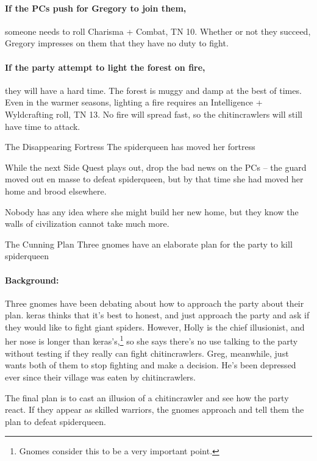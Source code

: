 \begin{multicols}{2}
\paragraph{If the PCs push for Gregory to join them,}
someone needs to roll Charisma + Combat, TN 10.
Whether or not they succeed, Gregory impresses on them that they have no duty to fight.


\paragraph{If the party attempt to light the forest on fire,}
they will have a hard time.
The forest is muggy and damp at the best of times.
Even in the warmer seasons, lighting a fire requires an Intelligence + Wyldcrafting roll, TN 13.
No fire will spread fast, so the chitincrawlers will still have time to attack.

{\squash The Disappearing Fortress}%
{The \gls{spiderqueen} has moved her fortress}%

While the next Side Quest plays out, drop the bad news on the PCs -- the \gls{guard} moved out en masse to defeat \gls{spiderqueen}, but by that time she had moved her home and brood elsewhere.

Nobody has any idea where she might build her new home, but they know the walls of civilization cannot take much more.

{The Cunning Plan}%
{Three gnomes have an elaborate plan for the party to kill \gls{spiderqueen}}%

\paragraph{Background:}
Three gnomes have been debating about how to approach the party about their plan.
\Gls{keras} thinks that it's best to honest, and just approach the party and ask if they would like to fight giant spiders.
However, Holly is the chief illusionist, and her nose is longer than \gls{keras}'s,\footnote{Gnomes consider this to be a very important point.} so she says there's no use talking to the party without testing if they really can fight chitincrawlers.
Greg, meanwhile, just wants both of them to stop fighting and make a decision.
He's been depressed ever since their village was eaten by chitincrawlers.

The final plan is to cast an illusion of a chitincrawler and see how the party react.
If they appear as skilled warriors, the gnomes approach and tell them the plan to defeat \gls{spiderqueen}.


\end{multicols}
